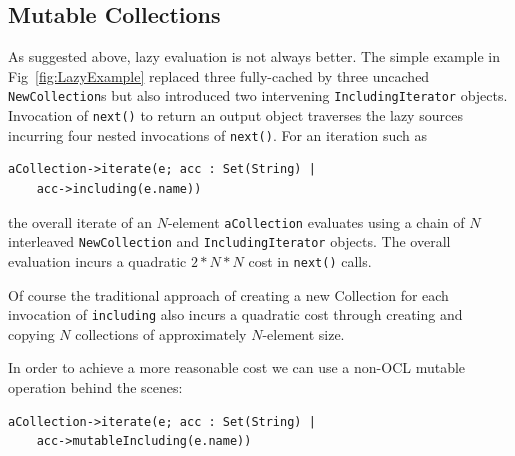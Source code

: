 \documentclass{llncs}
\begin{document}



\subsection{Mutable Collections}

As suggested above, lazy evaluation is not always better. The simple example in Fig~\ref{fig:LazyExample} replaced three fully-cached by three uncached \verb$NewCollection$s but also introduced two intervening \verb$IncludingIterator$ objects. Invocation of \verb$next()$ to return an output object traverses the lazy sources incurring four nested invocations of \verb$next()$. For an iteration such as

\begin{verbatim}
aCollection->iterate(e; acc : Set(String) |
    acc->including(e.name))
\end{verbatim}

the overall iterate of an $N$-element \verb$aCollection$ evaluates using a chain of $N$ interleaved \verb$NewCollection$ and \verb$IncludingIterator$ objects. The overall evaluation incurs a quadratic $2*N*N$ cost in \verb$next()$ calls.

Of course the traditional approach of creating a new Collection for each invocation of \verb$including$ also incurs a quadratic cost through creating and copying $N$ collections of approximately $N$-element size.

In order to achieve a more reasonable cost we can use a non-OCL mutable operation behind the scenes:

\begin{verbatim}
aCollection->iterate(e; acc : Set(String) |
    acc->mutableIncluding(e.name))
\end{verbatim}
\end{document}
